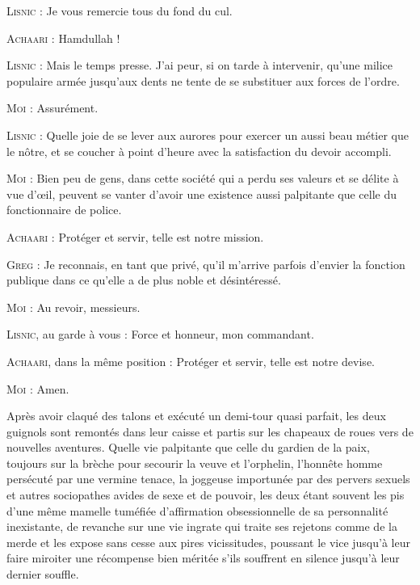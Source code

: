 \begin{dialogue}
\textsc{Lisnic} : Je vous remercie tous du fond du cul.

\textsc{Achaari} : Hamdullah !

\textsc{Lisnic} : Mais le temps presse. J’ai peur, si on tarde à intervenir, qu’une milice populaire armée jusqu’aux dents ne tente de se substituer aux forces de l’ordre.

\textsc{Moi} : Assurément.

\textsc{Lisnic} : Quelle joie de se lever aux aurores pour exercer un aussi beau métier que le nôtre, et se coucher à point d’heure avec la satisfaction du devoir accompli.

\textsc{Moi} : Bien peu de gens, dans cette société qui a perdu ses valeurs et se délite à vue d’œil, peuvent se vanter d’avoir une existence aussi palpitante que celle du fonctionnaire de police.

\textsc{Achaari} : Protéger et servir, telle est notre mission.

\textsc{Greg} : Je reconnais, en tant que privé, qu’il m’arrive parfois d’envier la fonction publique dans ce qu’elle a de plus noble et désintéressé.

\textsc{Moi} : Au revoir, messieurs.

\textsc{Lisnic}, au garde à vous : Force et honneur, mon commandant.

\textsc{Achaari}, dans la même position : Protéger et servir, telle est notre devise.

\textsc{Moi} : Amen.

\end{dialogue}

Après avoir claqué des talons et exécuté un demi-tour quasi parfait, les deux guignols sont remontés dans leur caisse et partis sur les chapeaux de roues vers de nouvelles aventures. \label{rat:36}Quelle vie palpitante que celle du gardien de la paix, toujours sur la brèche pour secourir la veuve et l’orphelin, l’honnête homme persécuté par une vermine tenace, la joggeuse importunée par des pervers sexuels et autres sociopathes avides de sexe et de pouvoir, les deux étant souvent les pis d’une même mamelle tuméfiée d’affirmation obsessionnelle de sa personnalité inexistante, de revanche sur une vie ingrate qui traite ses rejetons comme de la merde et les expose sans cesse aux pires vicissitudes, poussant le vice jusqu’à leur faire miroiter une récompense bien méritée s’ils souffrent en silence jusqu’à leur dernier souffle.

